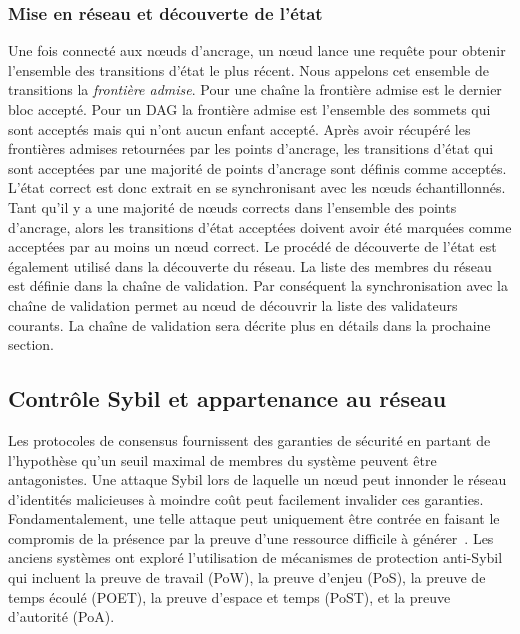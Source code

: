 \documentclass[runningheads,francais,a4paper]{llncs}
\begin{document}
\subsubsection{Mise en réseau et découverte de l'état}
Une fois connecté aux nœuds d'ancrage, un nœud lance une requête pour obtenir l'ensemble des transitions d'état
le plus récent. Nous appelons cet ensemble de transitions la \emph{frontière admise}. Pour une chaîne la frontière
admise est le dernier bloc accepté. Pour un DAG la frontière admise est l'ensemble des sommets qui sont acceptés mais
qui n'ont aucun enfant accepté. Après avoir récupéré les frontières admises retournées par les points d'ancrage, les
transitions d'état qui sont acceptées par une majorité de points d'ancrage sont définis comme acceptés. L'état correct
est donc extrait en se synchronisant avec les nœuds échantillonnés. Tant qu'il y a une majorité de nœuds corrects
dans l'ensemble des points d'ancrage, alors les transitions d'état acceptées doivent avoir été marquées comme
acceptées par au moins un nœud correct. Le procédé de découverte de l'état est également utilisé dans la découverte
du réseau. La liste des membres du réseau est définie dans la chaîne de validation. Par conséquent la synchronisation
avec la chaîne de validation permet au nœud de découvrir la liste des validateurs courants. La chaîne de validation
sera décrite plus en détails dans la prochaine section.

\subsection{Contrôle Sybil et appartenance au réseau}
Les protocoles de consensus fournissent des garanties de sécurité en partant de l'hypothèse qu'un seuil maximal de
membres du système peuvent être antagonistes. Une attaque Sybil lors de laquelle un nœud peut innonder le réseau
d'identités malicieuses à moindre coût peut facilement invalider ces garanties. Fondamentalement, une telle attaque peut
uniquement être contrée en faisant le compromis de la présence par la preuve d'une ressource difficile à
générer~\cite{douceur2002sybil}. Les anciens systèmes ont exploré l'utilisation de mécanismes de protection anti-Sybil
qui incluent la preuve de travail (PoW), la preuve d'enjeu (PoS), la preuve de temps écoulé (POET), la preuve d'espace
et temps (PoST), et la preuve d'autorité (PoA).
\end{document}
